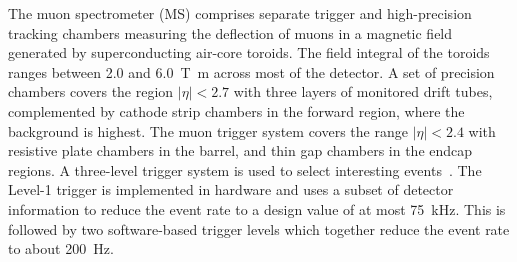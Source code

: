 The muon spectrometer (MS) comprises separate trigger and
high-precision tracking chambers measuring the deflection of muons in a magnetic field generated by superconducting air-core toroids.
The field integral of the toroids ranges between \num{2.0} and \SI{6.0}{\tesla\metre}
across most of the detector. 
A set of precision chambers covers the region $|\eta| < 2.7$ with three layers of monitored drift tubes,
complemented by cathode strip chambers in the forward region, where the background is highest.
The muon trigger system covers the range $|\eta| < 2.4$ with resistive plate chambers in the barrel, and thin gap chambers in the endcap regions.
A three-level trigger system is used to select interesting events~\cite{PERF-2011-02}.
The Level-1 trigger is implemented in hardware and uses a subset of detector information
to reduce the event rate to a design value of at most \SI{75}{\kHz}.
This is followed by two software-based trigger levels which together reduce the event rate to about \SI{200}{\Hz}.

